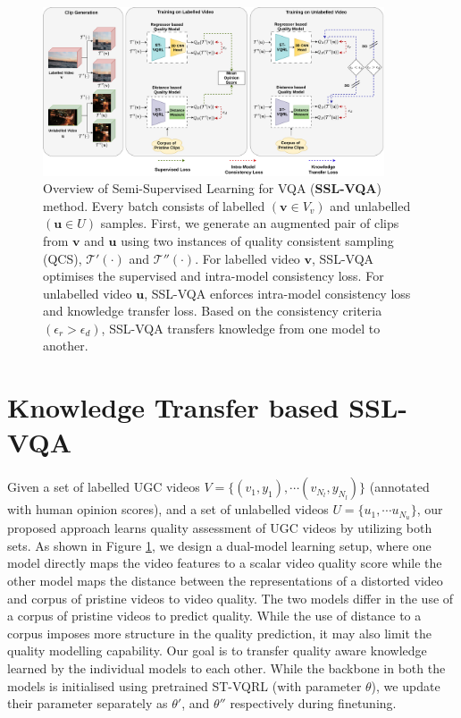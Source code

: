 \documentclass[10pt,twocolumn,letterpaper]{article}
\begin{document}
\begin{figure}
\begin{center}
\includegraphics[width=0.9\textwidth,keepaspectratio]{figures/sslvqa.png}
\end{center}
\caption{Overview of Semi-Supervised Learning for VQA (\textbf{SSL-VQA}) method. Every batch consists of labelled $(\textbf{v} \in V_v)$ and unlabelled $(\textbf{u} \in U)$ samples. First, we generate an augmented pair of clips from $\textbf{v}$ and $\textbf{u}$ using two instances of quality consistent sampling (QCS), $\mathcal{T}'(\cdot)$ and $\mathcal{T}''(\cdot)$. For labelled video $\textbf{v}$, SSL-VQA optimises the supervised and intra-model consistency loss. For unlabelled video $\textbf{u}$, SSL-VQA enforces intra-model consistency loss and knowledge transfer loss. Based on the consistency criteria $(\epsilon_r > \epsilon_d)$, SSL-VQA transfers knowledge from one model to another.}
\label{fig:sslvqa_framework}
\end{figure}

\section{Knowledge Transfer based SSL-VQA} \label{sec:ssl_vqa}
Given a set of labelled UGC videos $V= \{ (v_1,y_1), \cdots (v_{N_l},y_{N_l}) \}$ (annotated with human opinion scores), and a set of unlabelled videos $U = \{u_1, \cdots u_{N_u} \}$, our proposed approach learns quality assessment of UGC videos by utilizing both sets. 
As shown in Figure \ref{fig:sslvqa_framework}, we design a dual-model learning setup,  where one model directly maps the video features to a scalar video quality score while the other model maps the distance between the representations of a distorted video and corpus of pristine videos to video quality. The two models differ in the use of a corpus of pristine videos to predict quality. While the use of distance to a corpus imposes more structure in the quality prediction, it may also limit the quality modelling capability. Our goal is to transfer quality aware knowledge learned by the individual models to each other. While the backbone in both the models is initialised using pretrained ST-VQRL (with parameter $\theta$), we update their parameter separately as $\theta'$, and $\theta''$ respectively during finetuning.
\end{document}
